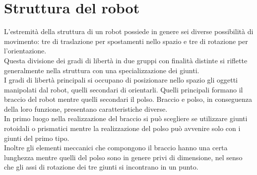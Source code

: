 \documentclass[%
corpo=11pt,
twoside,
 stile=classica,
oldstyle,
greek,%
]{toptesi}
\begin{document}
\section{Struttura del robot}
L'estremità della struttura di un robot possiede in genere sei diverse possibilità di movimento: tre di traslazione per spostamenti nello spazio e tre di rotazione per l'orientazione.\\
 Questa divisione dei gradi di libertà in due gruppi con finalità distinte si riflette generalmente nella struttura con una specializzazione dei giunti. \\
 I gradi di libertà principali si occupano di posizionare nello spazio gli oggetti manipolati dal robot, quelli secondari di orientarli. Quelli principali formano il braccio del robot mentre quelli secondari il polso. Braccio e polso, in conseguenza della loro funzione, presentano caratteristiche diverse. \\
 In primo luogo nella realizzazione del braccio si può scegliere se utilizzare giunti rotoidali o prismatici mentre la realizzazione del polso può avvenire solo con i giunti del primo tipo. \\
 Inoltre gli elementi meccanici che compongono il braccio hanno una certa lunghezza mentre quelli del polso sono in genere privi di dimensione, nel senso che gli assi di rotazione dei tre giunti si incontrano in un punto. 
\end{document}
